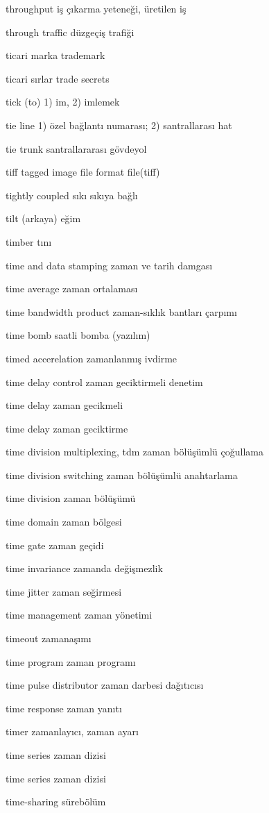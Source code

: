 \documentclass[12pt,fleqn]{article}\usepackage{../../common}
\begin{document}
throughput iş çıkarma yeteneği, üretilen iş

through traffic düzgeçiş trafiği

ticari marka trademark

ticari sırlar trade secrets

tick (to) 1) im, 2) imlemek

tie line 1) özel bağlantı numarası; 2) santrallarası hat

tie trunk santrallararası gövdeyol

tiff tagged image file format file(tiff)

tightly coupled sıkı sıkıya bağlı

tilt (arkaya) eğim

timber tını

time and data stamping zaman ve tarih damgası

time average zaman ortalaması

time bandwidth product zaman-sıklık bantları çarpımı

time bomb saatli bomba (yazılım)

timed accerelation zamanlanmış ivdirme

time delay control zaman geciktirmeli denetim

time delay zaman gecikmeli

time delay zaman geciktirme

time division multiplexing, tdm zaman bölüşümlü çoğullama

time division switching zaman bölüşümlü anahtarlama

time division zaman bölüşümü

time domain zaman bölgesi

time gate zaman geçidi

time invariance zamanda değişmezlik

time jitter zaman seğirmesi

time management zaman yönetimi

timeout zamanaşımı

time program zaman programı

time pulse distributor zaman darbesi dağıtıcısı

time response zaman yanıtı

timer zamanlayıcı, zaman ayarı

time series zaman dizisi

time series zaman dizisi

time-sharing sürebölüm
\end{document}
